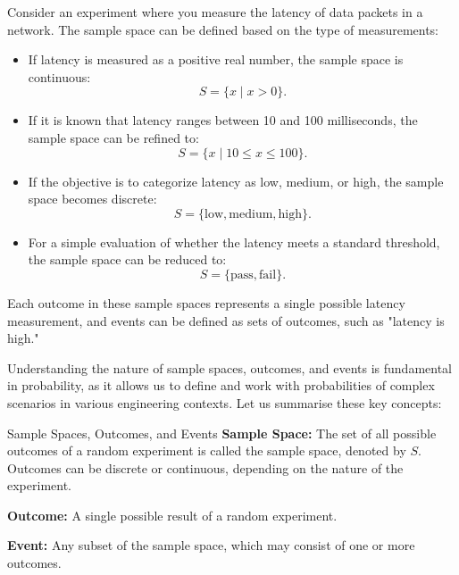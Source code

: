 \begin{example}\par
Consider an experiment where you measure the latency of data packets in a network. The sample space can be defined based on the type of measurements:
\begin{itemize}
    \item If latency is measured as a positive real number, the sample space is continuous:
    \[
    S = \{ x \mid x > 0 \}.
    \]
    \item If it is known that latency ranges between 10 and 100 milliseconds, the sample space can be refined to:
    \[
    S = \{ x \mid 10 \leq x \leq 100 \}.
    \]
    \item If the objective is to categorize latency as low, medium, or high, the sample space becomes discrete:
    \[
    S = \{\text{low}, \text{medium}, \text{high}\}.
    \]
    \item For a simple evaluation of whether the latency meets a standard threshold, the sample space can be reduced to:
    \[
    S = \{\text{pass}, \text{fail}\}.
    \]
\end{itemize}
Each outcome in these sample spaces represents a single possible latency measurement, and events can be defined as sets of outcomes, such as "latency is high."

\end{example}

Understanding the nature of sample spaces, outcomes, and events is fundamental in probability, as it allows us to define and work with probabilities of complex scenarios in various engineering contexts. Let us summarise these key concepts:

\begin{definition}{Sample Spaces, Outcomes, and Events}
    \textbf{Sample Space:} The set of all possible outcomes of a random experiment is called the sample space, denoted by \( S \). Outcomes can be discrete or continuous, depending on the nature of the experiment.

    \textbf{Outcome:} A single possible result of a random experiment.

    \textbf{Event:} Any subset of the sample space, which may consist of one or more outcomes.
\end{definition}

